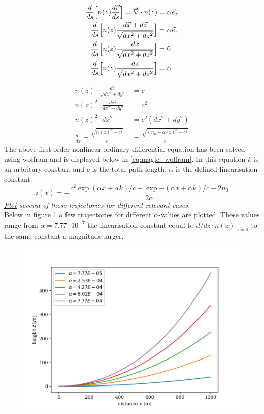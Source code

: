 \documentclass{article}
\begin{document}
\begin{align*}
	\frac{d}{ds} \Bigl[n(z)\frac{d\vec{r}}{ds}\Bigr] = \vec{\nabla}\cdot n(z) &= \alpha \vec{e}_z\\
	\frac{d}{ds} \Bigl[n(z)\frac{d\vec{x}+d\vec{z}}{\sqrt{dx^2 + dz^2}}\Bigr] &= \alpha \vec{e}_z\\
	\frac{d}{ds} \Bigl[n(z)\frac{dx}{\sqrt{dx^2 + dz^2}}\Bigr] &= 0\\
	\frac{d}{ds} \Bigl[n(z)\frac{dz}{\sqrt{dx^2 + dz^2}}\Bigr] &= \alpha\\
\end{align*}

\begin{align*}
	n(z)\cdot \frac{dx}{\sqrt{dx^2 + dy^2}} &= c\\
	n(z)^2 \cdot \frac{dx^2}{dx^2 + dy^2} &= c^2\\
	n(z)^2 \cdot dx^2 &= c^2(dx^2 + dy^2)\\
	\frac{dz}{dx} = \frac{\sqrt{n(z)^2 -c^2}}{c} &= \frac{\sqrt{(n_0+\alpha\cdot z)^2 -c^2}}{c}
\end{align*}
The above first-order nonlinear ordinary differential equation has been solved using wolfram and is displayed below in \ref{eq:magic_wolfram}. In this equation $k$ is an arbritary constant and $c$ is the total path length. $\alpha$ is the defined linearisation constant.
\begin{equation}
	z(x)=-\frac{c^2 \exp{(\alpha x + \alpha k)/c}+\exp{-(\alpha x + \alpha k)/c}-2n_0}{2 \alpha}
	\label{eq:magic_wolfram}
\end{equation}
\textit{\underline{Plot} several of these trajectories for different relevant cases.}\\

Below in figure \ref{fig:paths} a few trajectories for different $\alpha$-values are plotted. These values range from $\alpha = 7.77 \cdot 10^{-7}$ the linearisation constant equal to $d/dz \cdot n(z)\rvert_{z=0}$ to the same constant a magnitude larger.\\

\begin{figure}[h!]
	\centering
	\includegraphics[width=0.5\linewidth,keepaspectratio]{afbeeldingen/light path.png}
	\label{fig:paths}
\end{figure}
\end{document}
